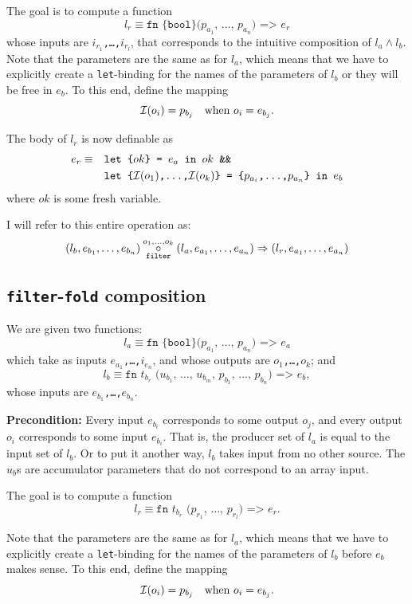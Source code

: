 The goal is to compute a function
\[
l_{r} \equiv \texttt{fn \{bool\} ($p_{a_{1}}$, \ldots, $p_{a_{n}}$)
=> $e_{r}$}
\]
whose inputs are \texttt{$i_{r_{1}}$,\ldots,$i_{r_{l}}$}, that
corresponds to the intuitive composition of $l_{a} \wedge l_{b}$.
Note that the parameters are the same as for $l_{a}$, which means that
we have to explicitly create a \texttt{let}-binding for the names of
the parameters of $l_{b}$ or they will be free in $e_{b}$.  To this end,
define the mapping
\[
\mathcal{I}(o_{i}) = p_{b_{j}} \quad \textrm{when $o_{i} = e_{b_{j}}$}.
\]

The body of $l_{r}$ is now definable as
\begin{align*}
e_{r} \equiv\quad&\texttt{let \{$ok$\} = $e_{a}$ in $ok$ \&\&} \\
& \texttt{let \{$\mathcal{I}(o_{1})$,\ldots,$\mathcal{I}(o_{k})$\} = \{$p_{a_{i}}$,\ldots,$p_{a_{n}}$\} in $e_{b}$}
\end{align*}
where $ok$ is some fresh variable.

I will refer to this entire operation as:
\[
(l_{b},e_{b_{1}},\ldots,e_{b_{n}}) \underset{\texttt{filter}}{\overset{o_{1},\ldots,o_{k}}\circ}(l_{a},e_{a_{1}},\ldots,e_{a_{n}}) \Rightarrow (l_{r},e_{a_{1}},\ldots,e_{a_{n}})
\]

\subsection{\texttt{filter}-\texttt{fold} composition}

We are given two functions:
\[
l_{a}\equiv\texttt{fn \{bool\} ($p_{a_{1}}$, \ldots, $p_{a_{n}}$) => $e_{a}$}
\]
which take as inputs \texttt{$e_{a_{1}}$,\ldots,$i_{e_{n}}$}, and whose
outputs are \texttt{$o_1$,\ldots,$o_k$}; and
\[
l_{b}\equiv\texttt{fn $t_{b_{r}}$ ($u_{b_{1}}$, \ldots, $u_{b_{m}}$, $p_{b_{1}}$, \ldots, $p_{b_{n}}$) => $e_{b}$},
\]
whose inputs are \texttt{$e_{b_{1}}$,\ldots,$e_{b_{n}}$}.

\textbf{Precondition:} Every input $e_{b_{i}}$ corresponds to some
output $o_{j}$, and every output $o_{i}$ corresponds to some input
$e_{b_{i}}$.  That is, the producer set of $l_{a}$ is equal to the
input set of $l_{b}$.  Or to put it another way, $l_{b}$ takes input
from no other source.  The $u_{b}$s are accumulator parameters that do
not correspond to an array input.

The goal is to compute a function
\[
l_{r} \equiv \texttt{fn $t_{b_{r}}$ ($p_{r_{1}}$, \ldots, $p_{r_{l}}$)
=> $e_{r}$}.
\]

Note that the parameters are the same as for $l_{a}$, which means that
we have to explicitly create a \texttt{let}-binding for the names of
the parameters of $l_{b}$ before $e_{b}$ makes sense.  To this end,
define the mapping
\[
\mathcal{I}(o_{i}) = p_{b_{j}} \quad \textrm{when $o_{i} = e_{b_{j}}$}.
\]

